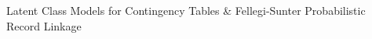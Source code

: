 \begin{frame}{\Large \vskip -0.3cm Latent Class Models for Contingency Tables \&\vskip 0.1cm Fellegi-Sunter Probabilistic Record Linkage}

\vskip -0.3cm

\tiny


\end{frame}
